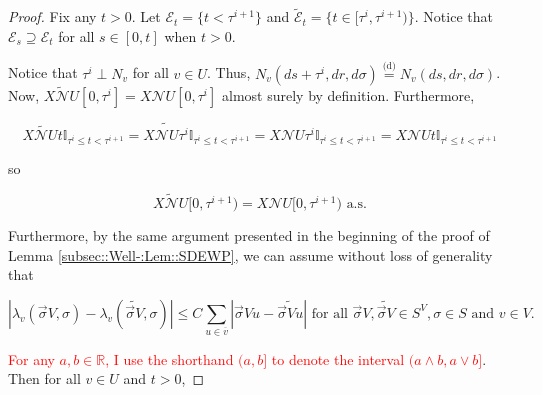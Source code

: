 \documentclass[12pt]{article}
\newcommand{\mb}{\mathbb}
\newcommand{\mc}{\mathcal}
\newcommand{\ov}{\overline}
\newcommand{\te}{\text}
\newcommand{\tr}{\textcolor{red}}
\newcommand{\ind}{\hspace{24pt}}
\newcommand{\deq}{\overset{\text{(d)}}{=}}			%
\renewcommand{\v}{v}							%
\newcommand{\vv}{u}								%
\renewcommand{\U}{U}							%
\renewcommand{\S}{S}							%
\newcommand{\s}{\sigma}							%
\newcommand{\sv}{\vec{\s}}						%
\renewcommand{\t}{t}							%
\renewcommand{\tt}{s}							%
\newcommand{\X}{X}								%
\newcommand{\neigh}{\mc{N}}						%
\newcommand{\cl}{\ov}							%
\newcommand{\poiss}[1]{N_{#1}}						%
\newcommand{\rt}[1]{\tau^{#1}}						%
\newcommand{\itt}{i}								%
\newcommand{\XState}[1]{\S^{#1}}				%
\newcommand{\rate}[1]{\lambda_{#1}}					%
\newcommand{\const}[1]{C_{#1}}						%
\newcommand{\alt}{\widetilde}						%
\newcommand{\evnt}{\mc{E}}						%
\begin{document}
\begin{proof}
\ind Fix any \(\t > 0\). Let \(\evnt_\t = \{\t < \rt{\itt+1}\}\) and \(\alt{\evnt}_\t = \{\t\in [\rt{\itt},\rt{\itt+1})\}\). Notice that \(\evnt_\tt \supseteq \evnt_\t\) for all \(\tt\in [0,\t]\) when \(\t > 0\). 

\ind Notice that \(\rt{\itt} \perp \poiss{\v}\) for all \(\v \in \U\). Thus, \(\poiss{\v}(d\tt+\rt{\itt},dr,d\s) \deq \poiss{\v}(d\tt,dr,d\s)\). Now, \(\alt{\X{\neigh{\U}}{}}[0,\rt{\itt}] = \X{\neigh{\U}}{[0,\rt{\itt}]}\) almost surely by definition. Furthermore,

\[\alt{\X{\neigh{\U}}{\t}}\mb{I}_{\rt{\itt}\leq \t < \rt{\itt+1}} = \alt{\X{\neigh{\U}}{\rt{\itt}}}\mb{I}_{\rt{\itt}\leq \t < \rt{\itt+1}} = \X{\neigh{\U}}{\rt{\itt}}\mb{I}_{\rt{\itt}\leq \t < \rt{\itt+1}} = \X{\neigh{\U}}{\t}\mb{I}_{\rt{\itt}\leq \t < \rt{\itt+1}}\]

so

\[\alt{\X{\neigh{\U}}{}}[0,\rt{\itt+1}) = \X{\neigh{\U}}{[0,\rt{\itt+1})} \te{ a.s.}\]

Furthermore, by the same argument presented in the beginning of the proof of Lemma \ref{subsec::Well-:Lem::SDEWP}, we can assume without loss of generality that 

\[|\rate{\v}(\sv{ V}{},\s) - \rate{\v}(\alt{\sv{ V}{}},\s)| \leq \const{}\sum_{\vv\in \cl{\v}} |\sv{ V}{\vv} - \alt{\sv{ V}{\vv}}|\te{ for all } \sv{ V}{},\alt{\sv{ V}{}}\in \S^ V,\s \in \S \te{ and } \v \in  V.\]

\tr{For any \(a,b\in \mb{R}\), I use the shorthand \((a,b]\) to denote the interval \((a\wedge b,a\vee b]\)}. Then for all \(v\in \U\) and \(\t > 0\),


\end{proof}
\end{document}

